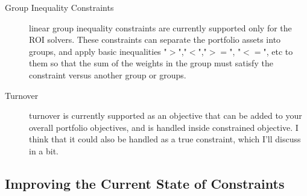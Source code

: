 \documentclass[12pt,letterpaper,english]{article}
\begin{document}
\begin{description}
\item[Group Inequality Constraints]linear group inequality constraints are currently supported only for the ROI solvers. These constraints can separate the portfolio assets into groups, and apply basic inequalities "$>$","$<$","$>=$", "$<=$", etc to them so that the sum of the weights in the group must satisfy the constraint versus another group or groups.


\item[Turnover] turnover is currently supported as an objective that can be added to your overall portfolio objectives, and is handled inside constrained objective.  I think that it could also be handled as a true constraint, which I'll discuss in a bit.

\end{description}

\subsection{Improving the Current State of Constraints}
\end{document}
